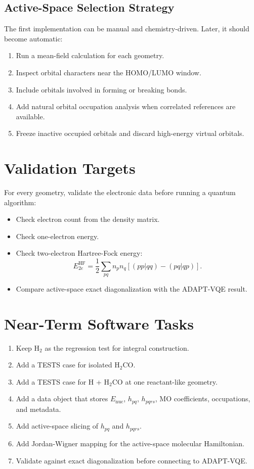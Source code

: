 \documentclass[11pt]{article}
\begin{document}
\subsection{Active-Space Selection Strategy}

The first implementation can be manual and chemistry-driven. Later, it should become automatic:
\begin{enumerate}[leftmargin=*]
  \item Run a mean-field calculation for each geometry.
  \item Inspect orbital characters near the HOMO/LUMO window.
  \item Include orbitals involved in forming or breaking bonds.
  \item Add natural orbital occupation analysis when correlated references are available.
  \item Freeze inactive occupied orbitals and discard high-energy virtual orbitals.
\end{enumerate}

\section{Validation Targets}

For every geometry, validate the electronic data before running a quantum algorithm:
\begin{itemize}[leftmargin=*]
  \item Check electron count from the density matrix.
  \item Check one-electron energy.
  \item Check two-electron Hartree-Fock energy:
  \begin{equation}
    E_{2e}^{\mathrm{HF}}
    =
    \frac{1}{2}\sum_{pq} n_p n_q
    \left[
      (pp|qq) - (pq|qp)
    \right].
  \end{equation}
  \item Compare active-space exact diagonalization with the ADAPT-VQE result.
\end{itemize}

\section{Near-Term Software Tasks}

\begin{enumerate}[leftmargin=*]
  \item Keep H$_2$ as the regression test for integral construction.
  \item Add a TESTS case for isolated H$_2$CO.
  \item Add a TESTS case for H + H$_2$CO at one reactant-like geometry.
  \item Add a data object that stores $E_{\mathrm{nuc}}$, $h_{pq}$, $h_{pqrs}$, MO coefficients, occupations, and metadata.
  \item Add active-space slicing of $h_{pq}$ and $h_{pqrs}$.
  \item Add Jordan-Wigner mapping for the active-space molecular Hamiltonian.
  \item Validate against exact diagonalization before connecting to ADAPT-VQE.
\end{enumerate}
\end{document}
